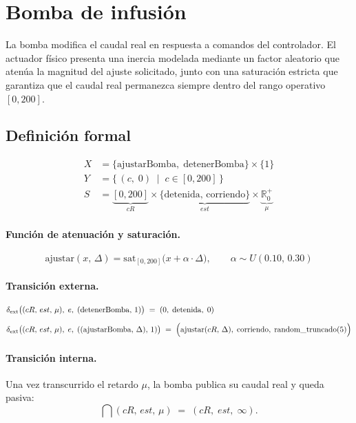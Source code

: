 \section{Bomba de infusión}

La bomba modifica el caudal real en respuesta a comandos del controlador. El actuador físico presenta una inercia modelada mediante un factor aleatorio que atenúa la magnitud del ajuste solicitado, junto con una saturación estricta que garantiza que el caudal real permanezca siempre dentro del rango operativo $[0, 200]$.

\subsection{Definición formal}

\begin{align*}
  X &= \{\mathrm{ajustarBomba},\;\mathrm{detenerBomba}\}\times\{1\} \\[4pt]
  Y &= \{\,(c,\;0)\;\mid\;c\in[0,200]\,\} \\[4pt]
  S &= \underbrace{[0,200]}_{\mathit{cR}}
     \times \underbrace{\{\mathrm{detenida},\,\mathrm{corriendo}\}}_{\mathit{est}}
     \times \underbrace{\mathbb{R}_0^+}_{\mu}
\end{align*}

\paragraph{Función de atenuación y saturación.}
\[
  \mathrm{ajustar}(x,\,\Delta) = \mathrm{sat}_{[0,200]}\bigl(x + \alpha\cdot\Delta\bigr),
  \qquad \alpha \sim U(0.10,\,0.30)
\]

\paragraph{Transición externa.}
\begin{align*}
\delta_{\mathrm{ext}}&\bigl((cR,\,est,\,\mu),\;e,\;(\mathrm{detenerBomba},\,1)\bigr)
  \;=\; (0,\;\mathrm{detenida},\;0)
\\[6pt]
\delta_{\mathrm{ext}}&\bigl((cR,\,est,\,\mu),\;e,\;((\mathrm{ajustarBomba},\,\Delta),\,1)\bigr)
  \;=\; \Bigl(\mathrm{ajustar}(cR,\,\Delta),\;
              \mathrm{corriendo},\;
              \mathrm{random\_truncado}(5)\Bigr)
\end{align*}

\paragraph{Transición interna.}
Una vez transcurrido el retardo $\mu$, la bomba publica su caudal real y queda pasiva:
\[
  \dint(cR,\,est,\,\mu) \;=\; (cR,\;est,\;\infty).
\]

